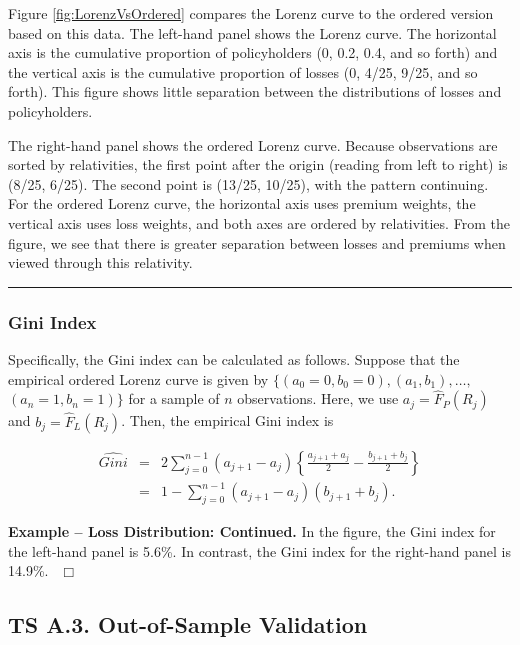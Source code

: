 \documentclass[]{book}
\theoremstyle{definition}
\theoremstyle{definition}
\theoremstyle{definition}
\theoremstyle{remark}
\begin{document}
Figure \ref{fig:LorenzVsOrdered} compares the Lorenz curve to the
ordered version based on this data. The left-hand panel shows the Lorenz
curve. The horizontal axis is the cumulative proportion of policyholders
(0, 0.2, 0.4, and so forth) and the vertical axis is the cumulative
proportion of losses (0, 4/25, 9/25, and so forth). This figure shows
little separation between the distributions of losses and policyholders.

The right-hand panel shows the ordered Lorenz curve. Because
observations are sorted by relativities, the first point after the
origin (reading from left to right) is (8/25, 6/25). The second point is
(13/25, 10/25), with the pattern continuing. For the ordered Lorenz
curve, the horizontal axis uses premium weights, the vertical axis uses
loss weights, and both axes are ordered by relativities. From the
figure, we see that there is greater separation between losses and
premiums when viewed through this relativity.

\begin{center}\rule{0.5\linewidth}{\linethickness}\end{center}

\subsubsection*{Gini Index}\label{gini-index}

Specifically, the Gini index can be calculated as follows. Suppose that
the empirical ordered Lorenz curve is given by
\(\{ (a_0=0, b_0=0), (a_1, b_1), \ldots,\) \((a_n=1, b_n=1) \}\) for a
sample of \(n\) observations. Here, we use \(a_j = \hat{F}_P(R_j)\) and
\(b_j = \hat{F}_{L}(R_j)\). Then, the empirical Gini index is

\begin{eqnarray}
\widehat{Gini} &=&  2\sum_{j=0}^{n-1} (a_{j+1} - a_j) \left \{
\frac{a_{j+1}+a_j}{2} - \frac{b_{j+1}+b_j}{2} \right\} \nonumber \\
&=& 1 - \sum_{j=0}^{n-1} (a_{j+1} - a_j) (b_{j+1}+b_j) .\label{eq:GiniDefn}
\end{eqnarray}

\textbf{Example -- Loss Distribution: Continued.} In the figure, the
Gini index for the left-hand panel is 5.6\%. In contrast, the Gini index
for the right-hand panel is 14.9\%. \(~~\Box\)

\subsection*{TS A.3. Out-of-Sample
Validation}\label{ts-a.3.-out-of-sample-validation}
\end{document}
